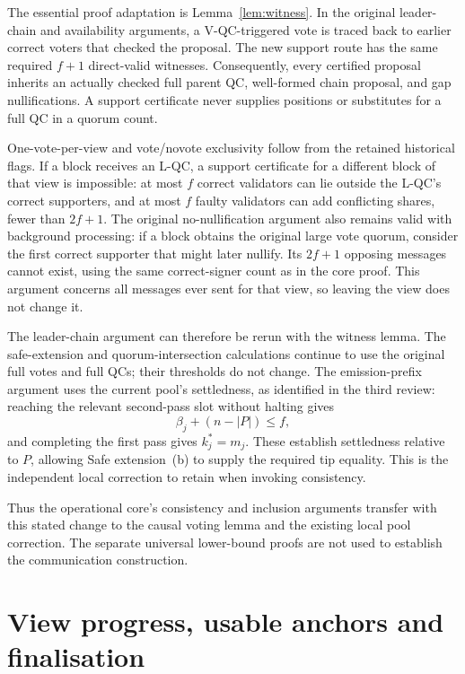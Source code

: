 \documentclass[11pt,a4paper]{article}
\theoremstyle{definition}
\begin{document}
The essential proof adaptation is Lemma~\ref{lem:witness}. In the original
leader-chain and availability arguments, a V-QC-triggered vote is traced
back to earlier correct voters that checked the proposal. The new support
route has the same required \(f+1\) direct-valid witnesses. Consequently,
every certified proposal inherits an actually checked full parent QC,
well-formed chain proposal, and gap nullifications. A support certificate
never supplies positions or substitutes for a full QC in a quorum count.

One-vote-per-view and vote/novote exclusivity follow from the retained
historical flags. If a block receives an L-QC, a support certificate for a
different block of that view is impossible: at most \(f\) correct validators
can lie outside the L-QC's correct supporters, and at most \(f\) faulty
validators can add conflicting shares, fewer than \(2f+1\).
The original no-nullification argument also remains
valid with background processing: if a block obtains the original large
vote quorum, consider the first correct supporter that might later
nullify. Its \(2f+1\) opposing messages cannot exist, using the same
correct-signer count as in the core proof. This argument concerns all
messages ever sent for that view, so leaving the view does not change it.

The leader-chain argument can therefore be rerun with the witness lemma.
The safe-extension and quorum-intersection calculations continue to use
the original full votes and full QCs; their thresholds do not change.
The emission-prefix argument uses the current pool's settledness, as
identified in the third review: reaching the relevant second-pass slot
without halting gives
\[
  \beta_j+(n-|P|)\le f,
\]
and completing the first pass gives \(k_j^*=m_j\). These establish
settledness relative to \(P\), allowing Safe extension~(b) to supply the
required tip equality. This is the independent local correction to retain
when invoking consistency.

Thus the operational core's consistency and inclusion arguments transfer
with this stated change to the causal voting lemma and the existing local
pool correction. The separate universal lower-bound proofs are not used
to establish the communication construction.

\section{View progress, usable anchors and finalisation}
\label{sec:live}
\end{document}
